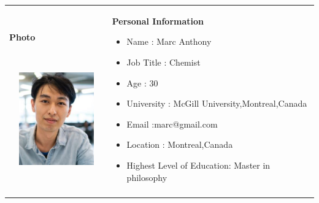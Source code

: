 \documentclass[12pt]{article}
\begin{document}
\begin{table}[H]
\begin{tabular}{p{1.86in}p{4.23in}}
\end{tabular}
 \end{table}
\begin{table}[H]
 			\centering
\begin{tabular}{p{1.65in}p{4.45in}}
\hline
\multicolumn{1}{|p{1.65in}}{{\fontsize{10pt}{12.0pt}\selectfont \textbf{Photo}} \par {\fontsize{10pt}{12.0pt}\selectfont \textbf{\ \ \ \ \   }} \par 
	\begin{Center}
		\includegraphics[width=1.65in,height=1.57in]{./marc.JPG}
	\end{Center}
} & 
\multicolumn{1}{|p{4.45in}|}{{\fontsize{10pt}{12.0pt}\selectfont \textbf{Personal Information}} \par \begin{itemize}
	\item {\fontsize{10pt}{12.0pt}\selectfont Name : Marc Anthony} \par 	\item {\fontsize{10pt}{12.0pt}\selectfont Job Title : Chemist} \par 	\item {\fontsize{10pt}{12.0pt}\selectfont Age : 30} \par 	\item {\fontsize{10pt}{12.0pt}\selectfont University : McGill University,Montreal,Canada} \par 	\item {\fontsize{10pt}{12.0pt}\selectfont Email :marc@gmail.com} \par 	\item {\fontsize{10pt}{12.0pt}\selectfont Location : Montreal,Canada} \par 	\item {\fontsize{10pt}{12.0pt}\selectfont Highest Level of Education: Master in philosophy}
\end{itemize} \par } \\
\hhline{--}
\multicolumn{2}{|p{6.29in}|}{{\fontsize{10pt}{12.0pt}\selectfont \textbf{Skills}} \par \begin{itemize}

\end{itemize}}
\end{tabular}
\end{table}
\end{document}
